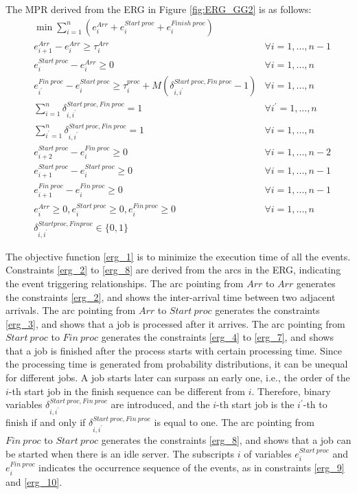 \documentclass[suppldata]{interact}
\theoremstyle{plain}
\theoremstyle{definition}
\theoremstyle{remark}
\begin{document}
The MPR derived from the ERG in Figure \ref{fig:ERG_GG2} is as follows:
\begin{eqnarray}
&  \min {\sum_{i=1}^n (e^{Arr}_i + e^{Start\ proc}_{i} + e^{Finish\ proc}_{i})} \label{erg_1}\\
& e^{Arr}_{i+1} - e^{Arr}_i \ge \tau^{Arr}_{i} &\forall i=1,...,n-1\label{erg_2}\\
& e^{Start\ proc}_{i} - e^{Arr}_i\ge 0 &\forall i=1,...,n\label{erg_3}\\
& e^{Fin\ proc}_{i^{'}} - e^{Start\ proc}_{i} \ge \tau^{proc}_{i} + M (\delta^{Start\ proc, Fin\ proc}_{i,i^{'}} -1)&\forall i=1,...,n\label{erg_4}\\ 
& \sum_{i=1}^{n} \delta^{Start\ proc, Fin\ proc}_{i,i^{'}} = 1 &\forall i^{'}=1,...,n\label{erg_6}\\
& \sum_{i^{'}=1}^{n} \delta^{Start\ proc, Fin\ proc}_{i,i^{'}} = 1 &\forall i=1,...,n\label{erg_7}\\
& e^{Start\ proc}_{i+2} -  e^{Fin\ proc}_{i} \ge 0 &\forall i=1,...,n-2\label{erg_8}\\
& e^{Start\ proc}_{i+1} - e^{Start\ proc}_{i} \ge 0 &\forall i=1,...,n-1\label{erg_9}\\
& e^{Fin\ proc}_{i+1} - e^{Fin\ proc}_{i} \ge 0 &\forall i=1,...,n-1\label{erg_10}\\
& e^{Arr}_i \ge 0, e^{Start\ proc}_{i} \ge 0, e^{Fin\ proc}_{i}\ge 0 &\forall i=1,...,n \label{erg_11} \\
& \delta^{Start proc, Fin proc}_{i,i^{'}} \in \{0,1\}
\end{eqnarray}

The objective function \eqref{erg_1} is to minimize the execution time of all the events. Constraints \eqref{erg_2} to \eqref{erg_8} are derived from the arcs in the ERG, indicating the event triggering relationships. The arc pointing from $Arr$ to $Arr$ generates the constraints \eqref{erg_2}, and shows the inter-arrival time between two adjacent arrivals. The arc pointing from $Arr$ to $Start\ proc$ generates the constraints \eqref{erg_3}, and shows that a job is processed after it arrives. The arc pointing from $Start\ proc$ to $Fin\ proc$ generates the constraints \eqref{erg_4} to \eqref{erg_7}, and shows that a job is finished after the process starts with certain processing time. Since the processing time is generated from probability distributions, it can be unequal for different jobs. A job starts later can surpass an early one, i.e., the order of the $i$-th start job in the finish sequence can be different from $i$. Therefore, binary variables $\delta^{Start\ proc, Fin\ proc}_{i,i^{'}}$ are introduced, and the $i$-th start job is the $i^{'}$-th to finish if and only if $\delta^{Start\ proc, Fin\ proc}_{i,i^{'}}$ is equal to one. The arc pointing from $Fin\ proc$ to $Start\ proc$ generates the constraints \eqref{erg_8}, and shows that a job can be started when there is an idle server. The subscripts $i$ of variables $e^{Start\ proc}_{i}$ and $e^{Fin\ proc}_{i}$ indicates the occurrence sequence of the events, as in constraints \eqref{erg_9} and \eqref{erg_10}. 
\end{document}
